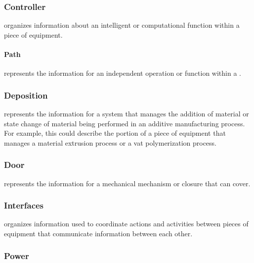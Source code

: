 \subsubsection{Controller}
\label{sec:Controller}



 organizes information about an intelligent or computational function within a piece of equipment.


\paragraph{Path}\mbox{}
\label{sec:Path}


 represents the information for an independent operation or function within a .


\subsubsection{Deposition}
\label{sec:Deposition}



 represents the information for a system that manages the addition of material or state change of material being performed in an additive manufacturing process.  For example, this could describe the portion of a piece of equipment that manages a material extrusion process or a vat polymerization process.


\subsubsection{Door}
\label{sec:Door}



 represents the information for a mechanical mechanism or closure that can cover.


\subsubsection{Interfaces}
\label{sec:Interfaces}



 organizes information used to coordinate actions and activities between pieces of equipment that communicate information between each other.


\subsubsection{Power}
\label{sec:Power}



